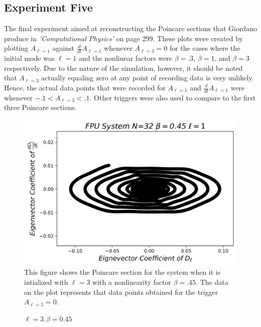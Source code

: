 \documentclass[twocolumn]{article}
\begin{document}
\subsection{Experiment Five}
The final experiment aimed at reconstructing the Poincare sections that Giordano produce in \textit{'Computational Physics'} on page 299. These plots were created by plotting $A_{\ell=1}$ against $\frac{d}{dt}A_{\ell=1}$ whenever $A_{\ell=3}=0$ for the cases where the initial mode was $\ell=1$ and the nonlinear factors were $\beta=.3$, $\beta=1$, and $\beta=3$ respectively. Due to the nature of the simulation, however, it should be noted that $A_{\ell=3}$ actually equaling zero at any point of recording data is very unlikely. Hence, the actual data points that were recorded for $A_{\ell=1}$ and $\frac{d}{dt}A_{\ell=1}$ were whenever $-.1<A_{\ell=3}<.1$. Other triggers were also used to compare to the first three Poincare sections.
\begin{figure}[ht!]
\centering
\caption{$\ell=3$ $\beta=0.45$}
\includegraphics[scale=.55]{Poincare5aN=3B=0}
\small{This figure shows the Poincare section for the system when it is intialized with $\ell=3$ with a nonlinearity factor $\beta=.45$. The data on the plot represents that data points obtained for the trigger $A_{\ell=5}=0$.}
\end{figure}
\end{document}
